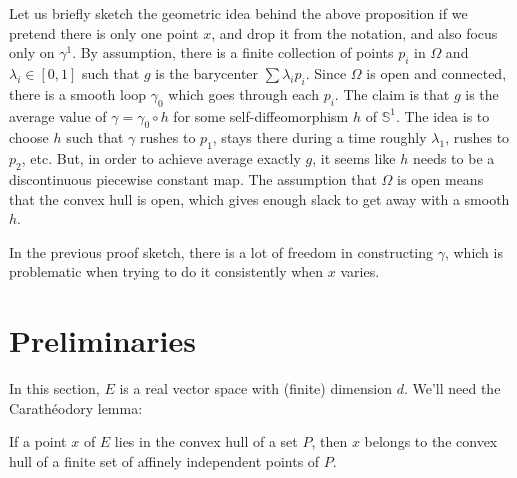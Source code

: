 Let us briefly sketch the geometric idea behind the above proposition
if we pretend there is only one point $x$, and drop it from the
notation, and also focus only on $γ^1$.
By assumption, there is a finite collection of points $p_i$ in $Ω$ and $λ_i ∈
[0, 1]$ such that $g$ is the barycenter $\sum λ_i p_i$. Since $Ω$ is open and
connected, there is a smooth loop $γ_0$ which goes through each $p_i$. The
claim is that $g$ is the average value of $γ = γ_0 ∘ h$ for some
self-diffeomorphism $h$ of $𝕊^1$. The idea is to choose $h$ such that
$γ$ rushes to $p_1$, stays there during a time roughly $λ_1$, rushes to
$p_2$, etc. But, in order to achieve average exactly $g$, it seems like $h$
needs to be a discontinuous piecewise constant map. The assumption that $Ω$ is
open means that the convex hull is open, which gives enough slack to get away with
a smooth $h$.

In the previous proof sketch, there is a lot of freedom in constructing $γ$,
which is problematic when trying to do it consistently when $x$ varies.

\section{Preliminaries}
\label{sec:preliminaries}

In this section, $E$ is a real vector space with (finite) dimension $d$.
We'll need the Carathéodory lemma:

\begin{lemma}
\label{lem:caratheodory}
\leanok
  If a point $x$ of $E$ lies in the convex hull of a set $P$, then $x$
  belongs to the convex hull of a finite set of affinely independent points
  of $P$.
\end{lemma}

